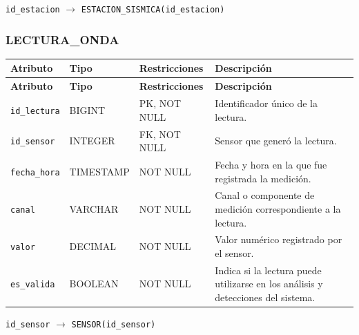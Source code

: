 \documentclass[12pt,a4paper]{article}
\begin{document}
\noindent
\texttt{id\_\allowbreak{}estacion}
$\rightarrow$
\texttt{ESTACION\_\allowbreak{}SISMICA(id\_\allowbreak{}estacion)}


\subsubsection*{LECTURA\_ONDA}

{
\small
\setlength{\tabcolsep}{3pt}
\renewcommand{\arraystretch}{1.15}

\begin{longtable}{
    >{\raggedright\arraybackslash}p{4.25cm}
    >{\raggedright\arraybackslash}p{2.65cm}
    >{\raggedright\arraybackslash}p{3.85cm}
    >{\raggedright\arraybackslash}p{3.85cm}
}
\toprule
\textbf{Atributo} &
\textbf{Tipo} &
\textbf{Restricciones} &
\textbf{Descripción} \\
\midrule
\endfirsthead

\toprule
\textbf{Atributo} &
\textbf{Tipo} &
\textbf{Restricciones} &
\textbf{Descripción} \\
\midrule
\endhead

\texttt{id\_\allowbreak{}lectura} &
BIGINT &
PK, NOT NULL &
Identificador único de la lectura. \\

\texttt{id\_\allowbreak{}sensor} &
INTEGER &
FK, NOT NULL &
Sensor que generó la lectura. \\

\texttt{fecha\_\allowbreak{}hora} &
TIMESTAMP &
NOT NULL &
Fecha y hora en la que fue registrada la medición. \\

\texttt{canal} &
VARCHAR &
NOT NULL &
Canal o componente de medición correspondiente a la lectura. \\

\texttt{valor} &
DECIMAL &
NOT NULL &
Valor numérico registrado por el sensor. \\

\texttt{es\_\allowbreak{}valida} &
BOOLEAN &
NOT NULL &
Indica si la lectura puede utilizarse en los análisis y detecciones del sistema. \\

\bottomrule
\end{longtable}
}

\noindent
\texttt{id\_\allowbreak{}sensor}
$\rightarrow$
\texttt{SENSOR(id\_\allowbreak{}sensor)}
\end{document}

